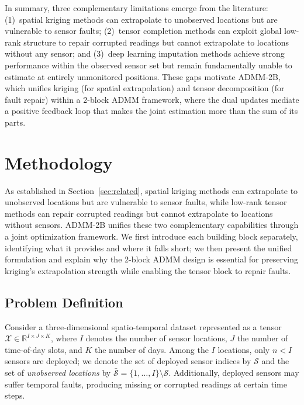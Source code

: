 \documentclass[journal]{IEEEtran}
\newcommand{\Xcal}{\mathcal{X}}
\newcommand{\Sset}{\mathcal{S}}
\newcommand{\Sbar}{\bar{\mathcal{S}}}
\begin{document}
In summary, three complementary limitations emerge from the literature: (1)~spatial kriging methods can extrapolate to unobserved locations but are vulnerable to sensor faults; (2)~tensor completion methods can exploit global low-rank structure to repair corrupted readings but cannot extrapolate to locations without any sensor; and (3)~deep learning imputation methods achieve strong performance within the observed sensor set but remain fundamentally unable to estimate at entirely unmonitored positions. These gaps motivate ADMM-2B, which unifies kriging (for spatial extrapolation) and tensor decomposition (for fault repair) within a 2-block ADMM framework, where the dual updates mediate a positive feedback loop that makes the joint estimation more than the sum of its parts.

\section{Methodology}\label{sec:method}

As established in Section~\ref{sec:related}, spatial kriging methods can extrapolate to unobserved locations but are vulnerable to sensor faults, while low-rank tensor methods can repair corrupted readings but cannot extrapolate to locations without sensors. ADMM-2B unifies these two complementary capabilities through a joint optimization framework. We first introduce each building block separately, identifying what it provides and where it falls short; we then present the unified formulation and explain why the 2-block ADMM design is essential for preserving kriging's extrapolation strength while enabling the tensor block to repair faults.

\subsection{Problem Definition}\label{sec:problem}

Consider a three-dimensional spatio-temporal dataset represented as a tensor $\Xcal \in \mathbb{R}^{I \times J \times K}$, where $I$ denotes the number of sensor locations, $J$ the number of time-of-day slots, and $K$ the number of days. Among the $I$ locations, only $n < I$ sensors are deployed; we denote the set of deployed sensor indices by $\Sset$ and the set of \emph{unobserved locations} by $\Sbar = \{1,\dots,I\} \setminus \Sset$. Additionally, deployed sensors may suffer temporal faults, producing missing or corrupted readings at certain time steps.
\end{document}
